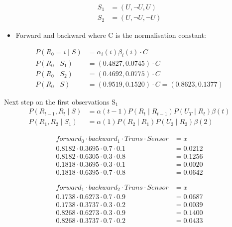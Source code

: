 \documentclass[colorlinks=true,linkcolor=blue]{article}
\begin{document}
\begin{align*}
S_1 &= (U, \neg U, U)\\
S_2 &= (U, \neg U, \neg U)
\end{align*}

\begin{itemize}
\item Forward and backward where C is the normalisation constant:
\end{itemize}
\begin{align*}
P(R_0 = i\mid S) &= \alpha_i(i)\beta_i(i) \cdot C\\
P(R_0 \mid S_1) &= (0.4827, 0.0745) \cdot C\\
P(R_0 \mid S_2) &= (0.4692, 0.0775) \cdot C\\
P(R_0 \mid S) &= (0.9519, 0.1520) \cdot  C = (0.8623, 0.1377)
\end{align*}

Next step on the first observations S$_{\text{1}}$
\begin{align*}
P(R_{t-1}, R_t \mid S) &= \alpha(t-1) P(R_t \mid R_{t-1}) P(U_T \mid R_t) \beta(t)\\
P(R_1, R_2 \mid S_1) &= \alpha(1)P(R_2 \mid R_1)P(U_2 \mid R_2)\beta(2)
\end{align*}

\begin{align*}
forward_0 \cdot backward_1 \cdot Trans \cdot Sensor &= x\\
0.8182 \cdot 0.3695 \cdot 0.7 \cdot 0.1 &= 0.0212 \\
0.8182 \cdot 0.6305 \cdot 0.3 \cdot 0.8 &= 0.1256 \\
0.1818 \cdot 0.3695 \cdot 0.3 \cdot 0.1 &= 0.0020 \\
0.1818 \cdot 0.6395 \cdot 0.7 \cdot 0.8 &= 0.0642 
\end{align*}

\begin{align*}
forward_1 \cdot backward_2 \cdot Trans \cdot Sensor &= x\\
0.1738 \cdot 0.6273 \cdot 0.7 \cdot 0.9 &= 0.0687 \\
0.1738 \cdot 0.3737 \cdot 0.3 \cdot 0.2 &= 0.0039 \\
0.8268 \cdot 0.6273 \cdot 0.3 \cdot 0.9 &= 0.1400 \\
0.8268 \cdot 0.3737 \cdot 0.7 \cdot 0.2 &= 0.0433 
\end{align*}
\end{document}
